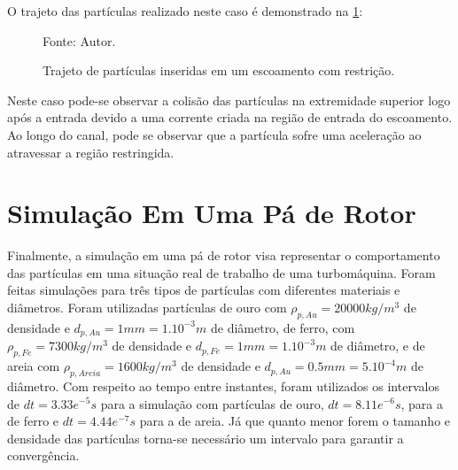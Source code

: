 O trajeto das partículas realizado neste caso é demonstrado na \ref{nozzle_trajectory}:
\begin{figure}[H]
    \centering
     {\raggedleft \scriptsize Fonte: Autor.}
    \caption{Trajeto de partículas inseridas em um escoamento com restrição.}
    \label{nozzle_trajectory}
\end{figure}

Neste caso pode-se observar a colisão das partículas na extremidade superior logo após a entrada devido a uma corrente criada na região de entrada do escoamento.
Ao longo do canal, pode se observar que a partícula sofre uma aceleração ao atravessar a região restringida.

\section{\textbf{Simulação Em Uma Pá de Rotor}}
\label{sec_rotor}
Finalmente, a simulação em uma pá de rotor visa representar o comportamento das partículas em uma situação real de trabalho de uma turbomáquina.
Foram feitas simulações para três tipos de partículas com diferentes materiais e diâmetros.
Foram utilizadas partículas de ouro com $\rho_{p,Au}=20000kg/m^3$ de densidade e $d_{p,Au}=1mm=1.10^{-3}m$ de diâmetro, de ferro, com $\rho_{p,Fe}=7300kg/m^3$ de densidade e $d_{p,Fe}=1mm=1.10^{-3}m$ de diâmetro, e de areia com $\rho_{p,Areia}=1600kg/m^3$ de densidade e $d_{p,Au}=0.5mm=5.10^{-4}m$ de diâmetro.
Com respeito ao tempo entre instantes, foram utilizados os intervalos de $dt=3.33e^{-5}s$ para a simulação com partículas de ouro, $dt=8.11e^{-6}s$, para a de ferro e $dt=4.44e^{-7}s$ para a de areia.
Já que quanto menor forem o tamanho e densidade das partículas torna-se necessário um intervalo para garantir a convergência.


